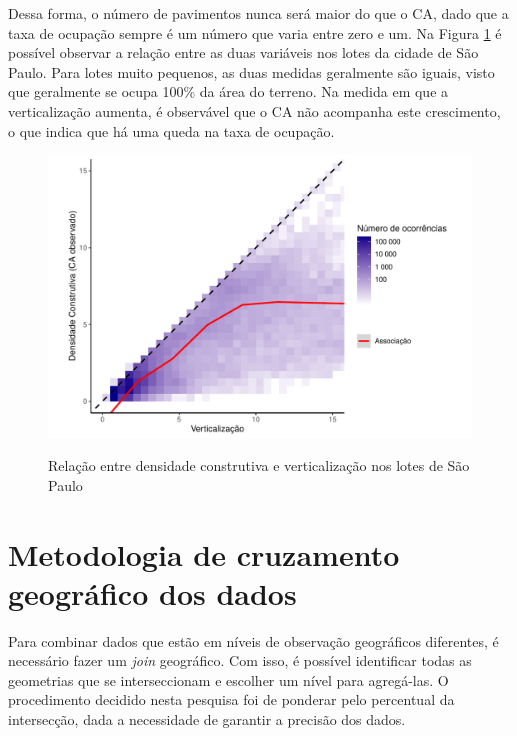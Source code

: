 \begin{apendicesenv}
Dessa forma, o número de pavimentos nunca será maior do que o CA, dado que a taxa de ocupação sempre é um número que varia entre zero e um. Na Figura \ref{fig:ca-vert} é possível observar a relação entre as duas variáveis nos lotes da cidade de São Paulo. Para lotes muito pequenos, as duas medidas geralmente são iguais, visto que geralmente se ocupa 100\% da área do terreno. Na medida em que a verticalização aumenta, é observável que o CA não acompanha este crescimento, o que indica que há uma queda na taxa de ocupação.

\begin{figure}[h]
    \centering
    \caption{Relação entre densidade construtiva e verticalização nos lotes de São Paulo}
    \includegraphics[width = \textwidth]{figuras/ca_vs_verticalizacao.pdf}
    \label{fig:ca-vert}
\end{figure}

\chapter{Metodologia de cruzamento geográfico dos dados}
\label{appendix:cruzamento}

Para combinar dados que estão em níveis de observação geográficos diferentes, é necessário fazer um \textit{join} geográfico. Com isso, é possível identificar todas as geometrias que se interseccionam e escolher um nível para agregá-las. O procedimento decidido nesta pesquisa foi de ponderar pelo percentual da intersecção, dada a necessidade de garantir a precisão dos dados. 


\end{apendicesenv}
